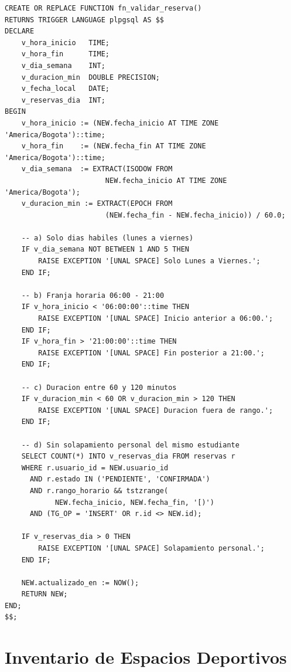 \documentclass[12pt, a4paper]{article}
\begin{document}
\begin{lstlisting}[caption={Fragmento del trigger de validación de reservas.}]
CREATE OR REPLACE FUNCTION fn_validar_reserva()
RETURNS TRIGGER LANGUAGE plpgsql AS $$
DECLARE
    v_hora_inicio   TIME;
    v_hora_fin      TIME;
    v_dia_semana    INT;
    v_duracion_min  DOUBLE PRECISION;
    v_fecha_local   DATE;
    v_reservas_dia  INT;
BEGIN
    v_hora_inicio := (NEW.fecha_inicio AT TIME ZONE 'America/Bogota')::time;
    v_hora_fin    := (NEW.fecha_fin AT TIME ZONE 'America/Bogota')::time;
    v_dia_semana  := EXTRACT(ISODOW FROM
                        NEW.fecha_inicio AT TIME ZONE 'America/Bogota');
    v_duracion_min := EXTRACT(EPOCH FROM
                        (NEW.fecha_fin - NEW.fecha_inicio)) / 60.0;

    -- a) Solo dias habiles (lunes a viernes)
    IF v_dia_semana NOT BETWEEN 1 AND 5 THEN
        RAISE EXCEPTION '[UNAL SPACE] Solo Lunes a Viernes.';
    END IF;

    -- b) Franja horaria 06:00 - 21:00
    IF v_hora_inicio < '06:00:00'::time THEN
        RAISE EXCEPTION '[UNAL SPACE] Inicio anterior a 06:00.';
    END IF;
    IF v_hora_fin > '21:00:00'::time THEN
        RAISE EXCEPTION '[UNAL SPACE] Fin posterior a 21:00.';
    END IF;

    -- c) Duracion entre 60 y 120 minutos
    IF v_duracion_min < 60 OR v_duracion_min > 120 THEN
        RAISE EXCEPTION '[UNAL SPACE] Duracion fuera de rango.';
    END IF;

    -- d) Sin solapamiento personal del mismo estudiante
    SELECT COUNT(*) INTO v_reservas_dia FROM reservas r
    WHERE r.usuario_id = NEW.usuario_id
      AND r.estado IN ('PENDIENTE', 'CONFIRMADA')
      AND r.rango_horario && tstzrange(
            NEW.fecha_inicio, NEW.fecha_fin, '[)')
      AND (TG_OP = 'INSERT' OR r.id <> NEW.id);

    IF v_reservas_dia > 0 THEN
        RAISE EXCEPTION '[UNAL SPACE] Solapamiento personal.';
    END IF;

    NEW.actualizado_en := NOW();
    RETURN NEW;
END;
$$;
\end{lstlisting}


\section{Inventario de Espacios Deportivos}
\end{document}
